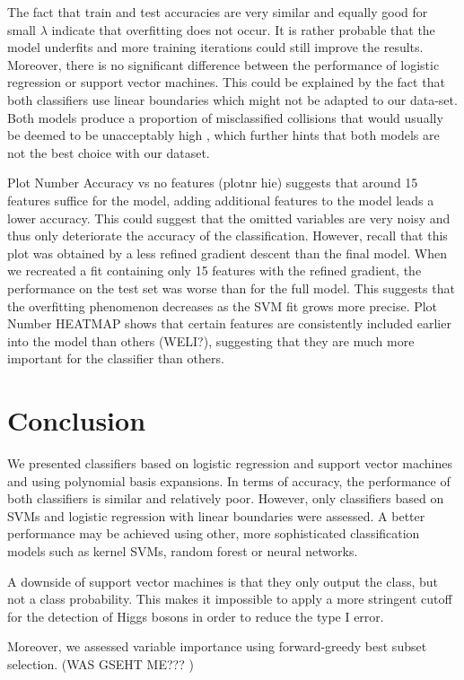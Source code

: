 \documentclass[10pt,conference,compsocconf]{IEEEtran}
\begin{document}
The fact that train and test accuracies are very similar and equally good for small $\lambda$ indicate that overfitting does not occur. It is rather probable that the model underfits and more training iterations could still improve the results. Moreover, there is no significant difference between the performance of logistic regression or support vector machines. This could be explained by the fact that both classifiers use linear boundaries which might not be adapted to our data-set. Both models produce a proportion of misclassified collisions that would usually be deemed to be unacceptably high \cite{advice}, which further hints that both models are not the best choice with our dataset.
\par
Plot Number Accuracy vs no features (plotnr hie) suggests that around 15 features suffice for the model, adding additional features to the model leads a lower accuracy. This could suggest that the omitted variables are very noisy and thus only deteriorate the accuracy of the classification.
However, recall that this plot was obtained by a less refined gradient descent than the final model. When we recreated a fit containing only 15 features with the refined gradient, the performance on the test set was worse than for the full model. This suggests that the overfitting phenomenon decreases as the SVM fit grows more precise.
Plot Number HEATMAP shows that certain features are consistently included earlier into the model than others (WELI?), suggesting that they are much more important for the classifier than others. 
\section*{Conclusion}
We presented classifiers based on logistic regression and support vector machines and using polynomial basis expansions. In terms of accuracy, the performance of both classifiers is similar and relatively poor. However, only classifiers based on SVMs and logistic regression with linear boundaries were assessed. A better performance may be achieved using other, more sophisticated classification models such as kernel SVMs, random forest or neural networks. 
\par
A downside of support vector machines is that they only output the class, but not a class probability. This makes it impossible to apply a more stringent cutoff for the detection of Higgs bosons in order to reduce the type I error. 
\par
Moreover, we assessed variable importance using forward-greedy best subset selection. (WAS GSEHT ME??? ) 


\end{document}
